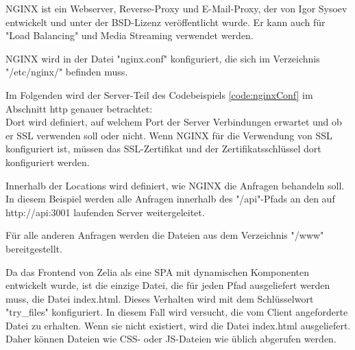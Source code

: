 

NGINX ist ein Webserver, Reverse-Proxy und E-Mail-Proxy, der von Igor Sysoev entwickelt und unter der BSD-Lizenz veröffentlicht wurde. Er kann auch für "Load Balancing" und Media Streaming verwendet werden.
\cite{WikiNginx}
\cite{nginx}

NGINX wird in der Datei "nginx.conf" konfiguriert, die sich im Verzeichnis "/etc/nginx/" befinden muss. 


Im Folgenden wird der Server-Teil des Codebeispiels \ref{code:nginxConf} im Abschnitt http genauer betrachtet: \\
Dort wird definiert, auf welchem Port der Server Verbindungen erwartet und ob er SSL verwenden soll oder nicht. Wenn NGINX für die Verwendung von SSL konfiguriert ist, müssen das SSL-Zertifikat und der Zertifikatsschlüssel dort konfiguriert werden.

Innerhalb der Locations wird definiert, wie NGINX die Anfragen behandeln soll. \\
In diesem Beispiel werden alle Anfragen innerhalb des "/api"-Pfads an den auf \\
http://api:3001 laufenden Server weitergeleitet.

Für alle anderen Anfragen werden die Dateien aus dem Verzeichnis "/www" bereitgestellt. 

Da das Frontend von Zelia als eine SPA mit dynamischen Komponenten entwickelt wurde, ist die einzige Datei, die für jeden Pfad ausgeliefert werden muss, die Datei index.html. Dieses Verhalten wird mit dem Schlüsselwort "try\_files" konfiguriert. In diesem Fall wird versucht, die vom Client angeforderte Datei zu erhalten. Wenn sie nicht existiert, wird die Datei index.html ausgeliefert. Daher können Dateien wie CSS- oder JS-Dateien wie üblich abgerufen werden.

